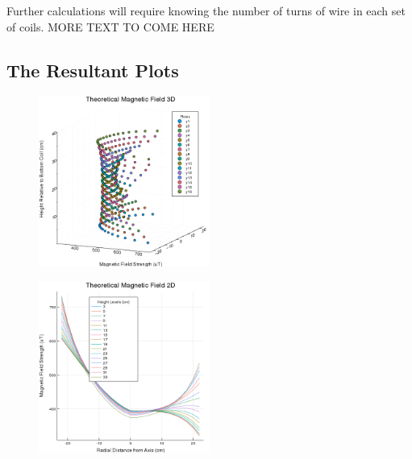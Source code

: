 \documentclass[a4paper]{article}
\begin{document}
Further calculations will require knowing the number of turns of wire
in each set of coils. MORE TEXT TO COME HERE
\subsection{The Resultant Plots}

\begin{figure}
\centering
\includegraphics[width=0.5\textwidth]{3DPlotTheoretical.png}
\label{Theoretical 3-D plot}
\end{figure} 
\begin{figure}
\centering
\includegraphics[width=0.5\textwidth]{2DPlotTheoretical.png}
\label{Theoretical 2-D plot}
\end{figure}
\end{document}
